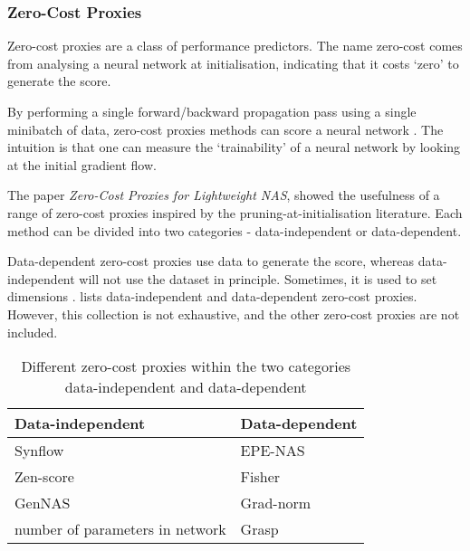 \subsubsection{Zero-Cost Proxies}\label{subsec:zerocost}
Zero-cost proxies are a class of performance predictors. The name zero-cost comes from analysing a neural network at initialisation, indicating that it costs `zero' to generate the score. 

By performing a single forward/backward propagation pass using a single minibatch of data, zero-cost proxies methods can score a neural network \autocite{akhauri2022evolving}. The intuition is that one can measure the `trainability' of a neural network by looking at the initial gradient flow. 

The paper \textit{Zero-Cost Proxies for Lightweight NAS}, \autocite{abdelfattah2021zero} showed the usefulness of a range of zero-cost proxies inspired by the pruning-at-initialisation literature. Each method can be divided into two categories - data-independent or data-dependent. 

Data-dependent zero-cost proxies use data to generate the score, whereas data-independent will not use the dataset in principle. Sometimes, it is used to set dimensions \autocite{colin2022adeeperlook}.  lists data-independent and data-dependent zero-cost proxies. However, this collection is not exhaustive, and the other zero-cost proxies are not included. 

\clearpage


\begin{table}[ht]
    \caption{Different zero-cost proxies within the two categories data-independent and data-dependent}
    \centering
    \begin{tabular}{l|l}
    \textbf{Data-independent}         & \textbf{Data-dependent} \\ \hline
    Synflow & EPE-NAS                   \\
    \cellcolor{verylightgray}Zen-score                       & \cellcolor{verylightgray}Fisher                    \\
    GenNAS                          & Grad-norm                 \\
    \cellcolor{verylightgray}number of parameters in network & \cellcolor{verylightgray}Grasp                                 
    \end{tabular}
    \label{tab:zcproxies}
\end{table}


